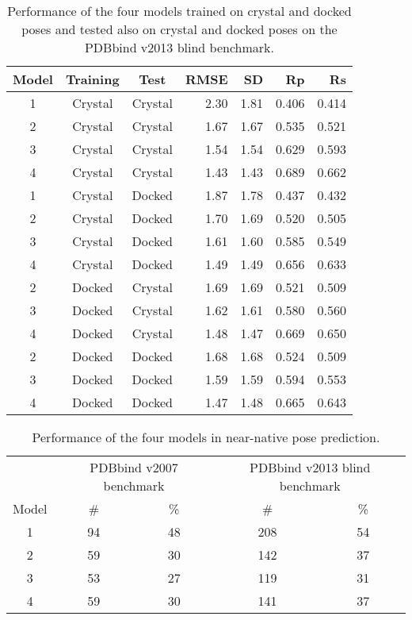 \documentclass[twocolumn]{bmcart}
\begin{document}
\begin{backmatter}
\begin{table}[ht]
\caption{Performance of the four models trained on crystal and docked poses and tested also on crystal and docked poses on the PDBbind v2013 blind benchmark.}
\label{rfscore4:tbl-set-2-pdbbind-2012}
\begin{tabular}{cccrrrr}
\hline
Model & Training & Test & RMSE & SD & Rp & Rs\\
\hline
1 & Crystal & Crystal & 2.30 & 1.81 & 0.406 & 0.414\\
2 & Crystal & Crystal & 1.67 & 1.67 & 0.535 & 0.521\\
3 & Crystal & Crystal & 1.54 & 1.54 & 0.629 & 0.593\\
4 & Crystal & Crystal & 1.43 & 1.43 & 0.689 & 0.662\\
\hline
1 & Crystal & Docked  & 1.87 & 1.78 & 0.437 & 0.432\\
2 & Crystal & Docked  & 1.70 & 1.69 & 0.520 & 0.505\\
3 & Crystal & Docked  & 1.61 & 1.60 & 0.585 & 0.549\\
4 & Crystal & Docked  & 1.49 & 1.49 & 0.656 & 0.633\\
\hline
2 & Docked  & Crystal & 1.69 & 1.69 & 0.521 & 0.509\\
3 & Docked  & Crystal & 1.62 & 1.61 & 0.580 & 0.560\\
4 & Docked  & Crystal & 1.48 & 1.47 & 0.669 & 0.650\\
\hline
2 & Docked  & Docked  & 1.68 & 1.68 & 0.524 & 0.509\\
3 & Docked  & Docked  & 1.59 & 1.59 & 0.594 & 0.553\\
4 & Docked  & Docked  & 1.47 & 1.48 & 0.665 & 0.643\\
\hline
\end{tabular}
\end{table}

\begin{table}[ht]
\caption{Performance of the four models in near-native pose prediction.}
\label{rfscore4:near-native}
\begin{tabular}{ccccc}
\hline
& \multicolumn{2}{c}{PDBbind v2007 benchmark} & \multicolumn{2}{c}{PDBbind v2013 blind benchmark}\\
Model & \# & \% & \# & \%\\
\hline
1 & 94 & 48 & 208 & 54\\
2 & 59 & 30 & 142 & 37\\
3 & 53 & 27 & 119 & 31\\
4 & 59 & 30 & 141 & 37\\
\hline
\end{tabular}
\end{table}


\end{backmatter}
\end{document}
